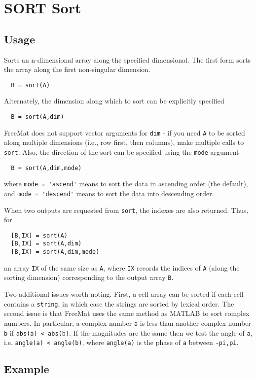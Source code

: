 \section{SORT Sort }

\subsection{Usage}

Sorts an n-dimensional array along the specified dimensional.  The first
form sorts the array along the first non-singular dimension.
\begin{verbatim}
  B = sort(A)
\end{verbatim}
Alternately, the dimension along which to sort can be explicitly specified
\begin{verbatim}
  B = sort(A,dim)
\end{verbatim}
FreeMat does not support vector arguments for \verb|dim| - if you need \verb|A| to be
sorted along multiple dimensions (i.e., row first, then columns), make multiple
calls to \verb|sort|.  Also, the direction of the sort can be specified using the 
\verb|mode| argument
\begin{verbatim}
  B = sort(A,dim,mode)
\end{verbatim}
where \verb|mode = 'ascend'| means to sort the data in ascending order (the default),
and \verb|mode = 'descend'| means to sort the data into descending order.  

When two outputs are requested from \verb|sort|, the indexes are also returned.
Thus, for 
\begin{verbatim}
  [B,IX] = sort(A)
  [B,IX] = sort(A,dim)
  [B,IX] = sort(A,dim,mode)
\end{verbatim}
an array \verb|IX| of the same size as \verb|A|, where \verb|IX| records the indices of \verb|A|
(along the sorting dimension) corresponding to the output array \verb|B|. 

Two additional issues worth noting.  First, a cell array can be sorted if each 
cell contains a \verb|string|, in which case the strings are sorted by lexical order.
The second issue is that FreeMat uses the same method as MATLAB to sort complex
numbers.  In particular, a complex number \verb|a| is less than another complex
number \verb|b| if \verb|abs(a) < abs(b)|.  If the magnitudes are the same then we 
test the angle of \verb|a|, i.e. \verb|angle(a) < angle(b)|, where \verb|angle(a)| is the
phase of \verb|a| between \verb|-pi,pi|.
\subsection{Example}


